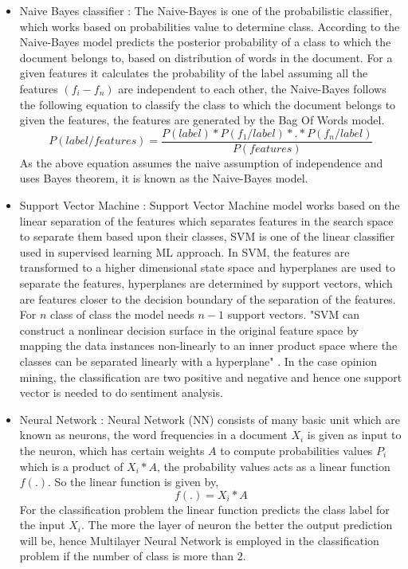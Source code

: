 \documentclass[sigconf]{acmart}
\begin{document}
\begin{itemize}
    \item Naive Bayes classifier : The Naive-Bayes is one of the probabilistic classifier, which works based on probabilities value to determine class. According to \cite{sentianalysis} the Naive-Bayes model predicts the posterior probability of a class to which the document belongs to, based on distribution of words in the document. For a given features it calculates the probability of the label assuming all the features $(f_i-f_n)$ are independent to each other, the Naive-Bayes follows the following equation to classify the class to which the document belongs to given the features, the features are generated by the Bag Of Words model.
    \begin{equation*}
        P(label/features) = \frac{P(label)*P(f_{1}/label)*.*P(f_{n}/label)}{P(features)}
    \end{equation*}
    As the above equation assumes the naive assumption of independence and uses Bayes theorem, it is known as the Naive-Bayes model.
    
    \item Support Vector Machine : Support Vector Machine model works based on the linear separation of the features which separates features in the search space to separate them based upon their classes, SVM is one of the linear classifier used in supervised learning ML approach. In SVM, the features are transformed to a higher dimensional state space and hyperplanes are used to separate the features, hyperplanes are determined by support vectors, which are features closer to the decision boundary of the separation of the features. For $n$ class of class the model needs $n-1$ support vectors. "SVM can construct a nonlinear decision surface in the original feature space by mapping the data instances non-linearly to an inner product space where the classes can be separated linearly with a hyperplane" \cite{sentianalysis}. In the case opinion mining, the classification are two positive and negative and hence one support vector is needed to do sentiment analysis.
    
    \item Neural Network : Neural Network (NN) consists of many basic unit which are known as neurons, the word frequencies in a document $X_i$ is given as input to the neuron, which has certain weights $A$ to compute probabilities values $P_i$ which is a product of $X_i*A$, the probability values acts as a linear function $f(.)$. So the linear function is given by,
    \begin{equation*}
    f(.) = X_i*A    
    \end{equation*}
    For the classification problem the linear function predicts the class label for the input $X_i$. The more the layer of neuron the better the output prediction will be, hence Multilayer Neural Network is employed in the classification problem if the number of class is more than 2.
\end{itemize}
\end{document}
